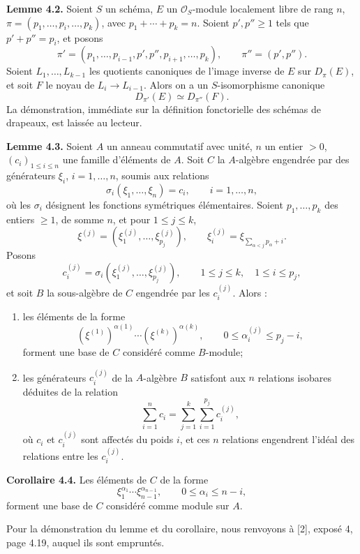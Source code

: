 \documentclass[11pt]{article}
\begin{document}
\textbf{Lemme 4.2.} Soient \(S\) un schéma, \(E\) un \(\mathcal O_S\)-module localement libre de rang \(n\), \(\pi=(p_1,\ldots,p_i,\ldots,p_k)\), avec \(p_1+\cdots+p_k=n\). Soient \(p',p''\geq1\) tels que \(p'+p''=p_i\), et posons
\[
  \pi'=(p_1,\ldots,p_{i-1},p',p'',p_{i+1},\ldots,p_k),
  \qquad
  \pi''=(p',p'').
\]
Soient \(L_1,\ldots,L_{k-1}\) les quotients canoniques de l'image inverse de \(E\) sur \(D_\pi(E)\), et soit \(F\) le noyau de \(L_i\to L_{i-1}\). Alors on a un \(S\)-isomorphisme canonique
\[
  D_{\pi'}(E)\simeq D_{\pi''}(F).
\]
La démonstration, immédiate sur la définition fonctorielle des schémas de drapeaux, est laissée au lecteur.

\textbf{Lemme 4.3.} Soient \(A\) un anneau commutatif avec unité, \(n\) un entier \(>0\), \((c_i)_{1\leq i\leq n}\) une famille d'éléments de \(A\). Soit \(C\) la \(A\)-algèbre engendrée par des générateurs \(\xi_i\), \(i=1,\ldots,n\), soumis aux relations
\[
  \sigma_i(\xi_1,\ldots,\xi_n)=c_i,\qquad i=1,\ldots,n,
\]
où les \(\sigma_i\) désignent les fonctions symétriques élémentaires. Soient \(p_1,\ldots,p_k\) des entiers \(\geq1\), de somme \(n\), et pour \(1\leq j\leq k\),
\[
  \xi^{(j)}=(\xi_1^{(j)},\ldots,\xi_{p_j}^{(j)}),
  \qquad
  \xi_i^{(j)}=\xi_{\sum_{\alpha<j}p_\alpha+i}.
\]
Posons
\[
  c_i^{(j)}=\sigma_i(\xi_1^{(j)},\ldots,\xi_{p_j}^{(j)}),
  \qquad 1\leq j\leq k,\quad 1\leq i\leq p_j,
\]
et soit \(B\) la sous-algèbre de \(C\) engendrée par les \(c_i^{(j)}\). Alors :
\begin{enumerate}[label=\roman*)]
\item les éléments de la forme
\[
  (\xi^{(1)})^{\alpha(1)}\cdots(\xi^{(k)})^{\alpha(k)},
  \qquad 0\leq \alpha_i^{(j)}\leq p_j-i,
\]
forment une base de \(C\) considéré comme \(B\)-module;
\item les générateurs \(c_i^{(j)}\) de la \(A\)-algèbre \(B\) satisfont aux \(n\) relations isobares déduites de la relation
\[
  \sum_{i=1}^{n}c_i=\sum_{j=1}^{k}\sum_{i=1}^{p_j}c_i^{(j)},
\]
où \(c_i\) et \(c_i^{(j)}\) sont affectés du poids \(i\), et ces \(n\) relations engendrent l'idéal des relations entre les \(c_i^{(j)}\).
\end{enumerate}

\textbf{Corollaire 4.4.} Les éléments de \(C\) de la forme
\[
  \xi_1^{\alpha_1}\cdots\xi_{n-1}^{\alpha_{n-1}},
  \qquad 0\leq \alpha_i\leq n-i,
\]
forment une base de \(C\) considéré comme module sur \(A\).

Pour la démonstration du lemme et du corollaire, nous renvoyons à [2], exposé 4, page 4.19, auquel ils sont empruntés.
\end{document}
